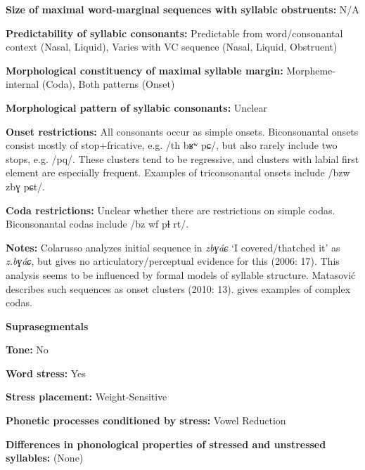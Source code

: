 \textbf{Size of maximal word{}-marginal sequences with syllabic obstruents:} N/A



\textbf{Predictability of syllabic consonants:} Predictable from word/consonantal context (Nasal, Liquid), Varies with VC sequence (Nasal, Liquid, Obstruent)



\textbf{Morphological constituency of maximal syllable margin:} Morpheme-internal (Coda), Both patterns (Onset)



\textbf{Morphological pattern of syllabic consonants:} Unclear



\textbf{Onset restrictions:} All consonants occur as simple onsets. Biconsonantal onsets consist mostly of stop+fricative, e.g. /th bʁʷ pɕ/, but also rarely include two stops, e.g. /pq/. These clusters tend to be regressive, and clusters with labial first element are especially frequent. Examples of triconsonantal onsets include /bzw zbɣ pɕt/.



\textbf{Coda restrictions:} Unclear whether there are restrictions on simple codas. Biconsonantal codas include /bz wf pɬ rt/.



\textbf{Notes:} Colarusso analyzes initial sequence in \textit{zbɣáɕ} ‘I covered/thatched it’ as \textit{z.bɣáɕ}, but gives no articulatory/perceptual evidence for this (2006: 17). This analysis seems to be influenced by formal models of syllable structure. Matasović describes such sequences as onset clusters (2010: 13). \citet{Applebaum2013} gives examples of complex codas.



\textbf{Suprasegmentals}



\textbf{Tone:} No



\textbf{Word stress:} Yes



\textbf{Stress placement:} Weight-Sensitive



\textbf{Phonetic processes conditioned by stress:} Vowel Reduction



\textbf{Differences in phonological properties of stressed and unstressed syllables:} (None)



